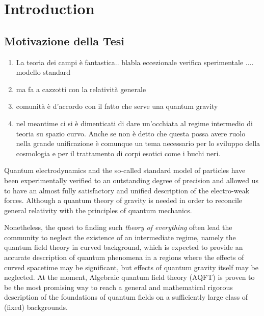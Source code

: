 \documentclass[Main]{subfiles}
\begin{document}
\chapter*{Introduction}
%
\ifToninus
\section{Motivazione della Tesi}
\begin{enumerate}
	\item La teoria dei campi è fantastica.. blabla  eccezionale verifica sperimentale .... modello standard
	\item ma fa a cazzotti con la relatività generale
	\item comunità è d'accordo con il fatto che serve una quantum gravity
	\item nel meantime ci si è dimenticati di dare un'occhiata al regime intermedio di teoria su spazio curvo. Anche se non è detto che questa possa avere ruolo nella grande unificazione è comunque un tema necessario per lo sviluppo della cosmologia e per il trattamento di corpi esotici come i buchi neri.
\end{enumerate}
\fi
Quantum electrodynamics and the so-called standard model of particles have been experimentally verified to an outstanding degree of precision and allowed us to have an almost fully satisfactory and unified description of the electro-weak forces. 
Although a quantum theory of gravity is needed in order to reconcile general relativity with the principles of quantum mechanics. 

Nonetheless, the quest to finding such \emph{theory of everything} often lead the community to neglect the existence of an intermediate regime, namely the quantum field theory in curved background, which is expected to provide an accurate description of quantum phenomena in a regions where the effects of curved spacetime may be significant, but effects of quantum gravity itself may be neglected. 
At the moment, Algebraic quantum field theory (AQFT) is proven to be the most promising way to reach a general and mathematical rigorous description of the foundations of quantum fields on a  sufficiently large class of (fixed) backgrounds.
\end{document}
